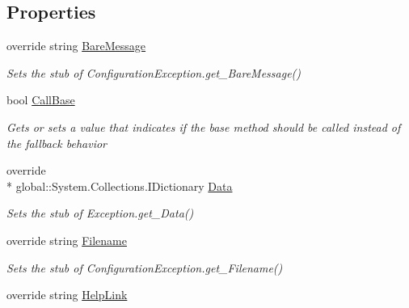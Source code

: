 \subsection*{Properties}
\begin{DoxyCompactItemize}
\item 
override string \hyperlink{class_system_1_1_configuration_1_1_fakes_1_1_stub_configuration_exception_a4c843762f68c5d35ed485c96055a8f01}{Bare\-Message}
\begin{DoxyCompactList}\small\item\em Sets the stub of Configuration\-Exception.\-get\-\_\-\-Bare\-Message()\end{DoxyCompactList}\item 
bool \hyperlink{class_system_1_1_configuration_1_1_fakes_1_1_stub_configuration_exception_abce600dc9c168004ddef207119e1f9e5}{Call\-Base}
\begin{DoxyCompactList}\small\item\em Gets or sets a value that indicates if the base method should be called instead of the fallback behavior\end{DoxyCompactList}\item 
override \\*
global\-::\-System.\-Collections.\-I\-Dictionary \hyperlink{class_system_1_1_configuration_1_1_fakes_1_1_stub_configuration_exception_a308582fa42a5a189eb4aded4fc2f89a4}{Data}
\begin{DoxyCompactList}\small\item\em Sets the stub of Exception.\-get\-\_\-\-Data()\end{DoxyCompactList}\item 
override string \hyperlink{class_system_1_1_configuration_1_1_fakes_1_1_stub_configuration_exception_aed1315a0740299707a1e08723e08822a}{Filename}
\begin{DoxyCompactList}\small\item\em Sets the stub of Configuration\-Exception.\-get\-\_\-\-Filename()\end{DoxyCompactList}\item 
override string \hyperlink{class_system_1_1_configuration_1_1_fakes_1_1_stub_configuration_exception_aeef6d4e4ab6a425adaf6e3ca99a6f416}{Help\-Link}

\end{DoxyCompactItemize}
